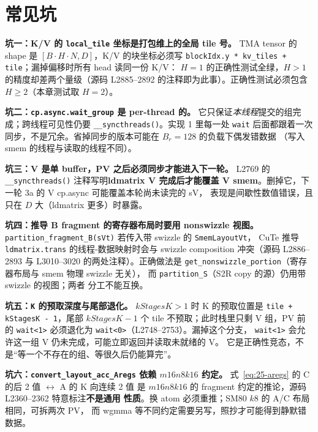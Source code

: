 \section{常见坑}

\textbf{坑一：K/V 的 \texttt{local\_tile} 坐标是打包维上的全局 tile 号。}
TMA tensor 的 shape 是 $[B\!\cdot\!H\!\cdot\!N, D]$，K/V 的块坐标必须写
\texttt{blockIdx.y * kv\_tiles + tile}；漏掉偏移时所有 head 读同一份 K/V：
$H{=}1$ 的正确性测试全绿，$H{>}1$ 的精度却差两个量级（源码 L2885--2892
的注释即为此事）。正确性测试必须包含 $H{\ge}2$（本章测试取 $H{=}2$）。

\textbf{坑二：\texttt{cp.\allowbreak{}async.\allowbreak{}wait\_\allowbreak{}group} 是 per-thread 的。}
它只保证\emph{本线程}提交的组完成；跨线程可见性仍要
\texttt{\_\allowbreak{}\_\allowbreak{}syncthreads\allowbreak{}()}。实现 1 里每一处 \texttt{wait} 后面都跟着一次
同步，不是冗余。省掉同步的版本可能在 $B_r{=}128$ 的负载下偶发错数据
（写入 smem 的线程与读取的线程不同）。

\textbf{坑三：V 是单 buffer，PV 之后必须同步才能进入下一轮。}
L2769 的 \texttt{\_\allowbreak{}\_\allowbreak{}syncthreads\allowbreak{}()} 注释写明\textbf{ldmatrix V 完成后才能覆盖
V smem}。删掉它，下一轮 3a 的 V cp.async 可能覆盖本轮尚未读完的 sV，
表现是间歇性数值错误，且只在 $D$ 大（ldmatrix 更多）时暴露。

\textbf{坑四：推导 B fragment 的寄存器布局时要用 nonswizzle 视图。}
\texttt{partition\_\allowbreak{}fragment\_\allowbreak{}B(sVt)} 若传入带 swizzle 的 \texttt{Smem\allowbreak{}Layout\allowbreak{}Vt}，
CuTe 推导 \texttt{ldmatrix.\allowbreak{}trans} 的线程-数据映射时会与 swizzle composition
冲突（源码 L2886--2893 与 L3010--3020 的两处注释）。正确做法是
\texttt{get\_\allowbreak{}nonswizzle\_\allowbreak{}portion}（寄存器布局与 smem 物理 swizzle 无关），
而 \texttt{partition\_S}（S2R copy 的源）仍用带 swizzle 的视图；两者
分工不能互换。

\textbf{坑五：\texttt{K} 的预取深度与尾部退化。}
$kStagesK>1$ 时 K 的预取位置是 \texttt{tile + kStagesK - 1}，尾部
$kStagesK{-}1$ 个 tile 不预取；此时栈里只剩 V 组，PV 前的 \texttt{wait<1>}
必须退化为 \texttt{wait<0>}（L2748--2753）。漏掉这个分支，
\texttt{wait<1>} 会允许这一组 V 仍未完成，可能立即返回并读取未就绪的 V。
它是正确性竞态，不是“等一个不存在的组、等很久后仍能算完”。

\textbf{坑六：\texttt{convert\_\allowbreak{}layout\_\allowbreak{}acc\_\allowbreak{}Aregs} 依赖 $m16n8k16$ 约定。}
式~\eqref{eq:25-aregs} 的 C 的后 2 值 $\leftrightarrow$ A 的 K 向连续 2 值
是 $m16n8k16$ 的 fragment 约定的推论，源码 L2360--2362 特意标注\textbf{不是通用
性质}。换 atom 必须重推；SM80 $k8$ 的 A/C 布局相同，可拆两次 PV，
而 wgmma 等不同约定需要另写，照抄才可能得到静默错数据。

